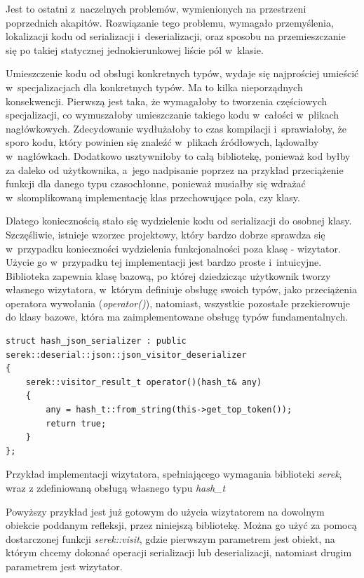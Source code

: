 \documentclass[12pt]{article}
\newcommand{\n}{\newline}
\newcommand{\nonpl}[1]{{\it #1}}
\newcommand{\code}[1]{{\it #1}}
\newcommand{\serek}{\nonpl{serek}}
\begin{document}
{{{				Jest to ostatni z~naczelnych problemów, wymienionych na przestrzeni poprzednich akapitów. Rozwiązanie tego problemu,
				wymagało przemyślenia, lokalizacji kodu od serializacji i~deserializacji, oraz sposobu na przemieszczanie się po takiej
				statycznej jednokierunkowej liście pól w~klasie.\n

				Umieszczenie kodu od obsługi konkretnych typów, wydaje się najprościej umieścić w~specjalizacjach dla konkretnych typów.
				Ma to kilka nieporządnych konsekwencji. Pierwszą jest taka, że wymagałoby to tworzenia częściowych specjalizacji, co
				wymuszałoby umieszczanie takiego kodu w~całości w~plikach nagłówkowych. Zdecydowanie wydłużałoby to czas kompilacji
				i~sprawiałoby, że sporo kodu, który powinien się znaleźć w~plikach źródłowych, lądowałby w~nagłówkach. Dodatkowo
				usztywniłoby to całą bibliotekę, ponieważ kod byłby za daleko od użytkownika, a~jego nadpisanie poprzez na przykład
				przeciążenie funkcji dla danego typu czasochłonne, ponieważ musiałby się wdrażać w~skomplikowaną implementację klas
				przechowujące pola, czy klasy.\n

				Dlatego koniecznością stało się wydzielenie kodu od serializacji do osobnej klasy. Szczęśliwie, istnieje wzorzec projektowy,
				który bardzo dobrze sprawdza się w~przypadku konieczności wydzielenia funkcjonalności poza klasę - wizytator\cite{visitor_description}.
				Użycie go w~przypadku tej implementacji jest bardzo proste i~intuicyjne. Biblioteka zapewnia klasę bazową, po której dziedzicząc
				użytkownik tworzy własnego wizytatora, w~którym definiuje obsługę swoich typów, jako przeciążenia operatora wywołania (\code{operator()}),
				natomiast, wszystkie pozostałe przekierowuje do klasy bazowe, która ma zaimplementowane obsługę typów fundamentalnych.\n

				\begin{captioned}[H]
					\begin{lstlisting}[frame=single]
struct hash_json_serializer : public serek::deserial::json::json_visitor_deserializer
{
	serek::visitor_result_t operator()(hash_t& any)
	{
		any = hash_t::from_string(this->get_top_token());
		return true;
	}
};
					\end{lstlisting}
					\caption{ Przykład implementacji wizytatora, spełniającego wymagania biblioteki \serek, wraz z zdefiniowaną obsługą własnego typu \code{hash_t}}
					\label{visitor_ex}
				\end{captioned}

				Powyższy przykład jest już gotowym do użycia wizytatorem na dowolnym obiekcie poddanym refleksji, przez niniejszą
				bibliotekę. Można go użyć za pomocą dostarczonej funkcji \code{serek::visit}, gdzie pierwszym parametrem jest obiekt, na którym
				chcemy dokonać operacji serializacji lub deserializacji, natomiast drugim parametrem jest wizytator.
			}
		}

}
\end{document}
